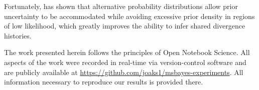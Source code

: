Fortunately, \citet{Oaks2014dpp} has shown that alternative probability
distributions allow prior uncertainty to be accommodated while avoiding
excessive prior density in regions of low likelihood, which greatly improves
the ability to infer shared divergence histories.


The work presented herein follows the principles of Open Notebook Science.
All aspects of the work were recorded in real-time via version-control software
and are publicly available at
\href{https://github.com/joaks1/msbayes-experiments}{\url{https://github.com/joaks1/msbayes-experiments}}.
All information necessary to reproduce our results is provided there.

